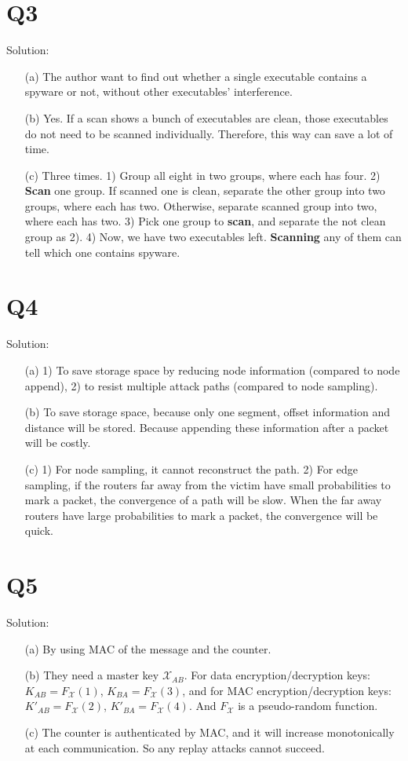 \documentclass[12pt,letterpaper]{article}
\begin{document}
\section{Q3}
Solution:
\begin{itemize}
 \item[(a)] The author want to find out whether a single executable 
 contains a spyware or not, without other executables' interference.
 \item[(b)] Yes. If a scan shows a bunch of executables are clean, 
 those executables do not need to be scanned individually. Therefore,
 this way can save a lot of time.
 \item[(c)] Three times. 1) Group all eight in two groups, where each
 has four. 2) \textbf{Scan} one group. If scanned one is clean, separate 
 the other group into two groups, where each has two. Otherwise,
 separate scanned group into two, where each has two. 3) Pick one
 group to \textbf{scan}, and separate the not clean group as 2). 4) Now,
 we have two executables left. \textbf{Scanning} any of them can tell which
 one contains spyware.
\end{itemize}

\section{Q4}
Solution:
\begin{itemize}
 \item[(a)] 1) To save storage space by reducing node information (compared
 to node append), 2) to resist multiple attack paths (compared to node sampling).
 \item[(b)] To save storage space, because only one segment, offset information
 and distance will be stored. Because appending these information after a
  packet will be costly.
 \item[(c)] 1) For node sampling, it cannot reconstruct the path. 2) For edge
 sampling, if the routers far away from the victim have small probabilities to 
 mark a packet, the convergence of a path will be slow. When the far away
  routers have large probabilities to mark a packet, the convergence will be
  quick.
\end{itemize}

\section{Q5}
Solution:
\begin{itemize}
 \item[(a)] By using MAC of the message and the counter.
 \item[(b)] They need a master key $\mathcal{X}_{AB}$. For data encryption/decryption
 keys: $K_{AB} = F_\mathcal{X}(1)$, $K_{BA} = F_\mathcal{X}(3)$, and for MAC
 encryption/decryption keys: $K'_{AB} = F_\mathcal{X}(2)$, $K'_{BA} = F_\mathcal{X}(4)$.
 And $F_\mathcal{X}$ is a pseudo-random function.
 \item[(c)] The counter is authenticated by MAC, and it will increase monotonically 
 at each communication. So any replay attacks cannot succeed.
\end{itemize}
\end{document}
